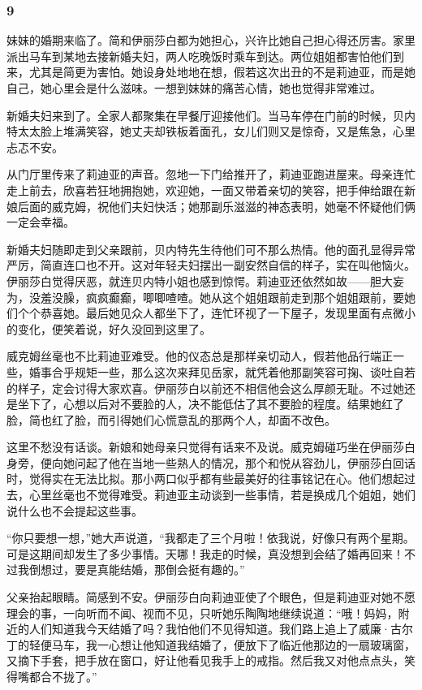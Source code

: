 \subsubsection*{9}


\par 妹妹的婚期来临了。简和伊丽莎白都为她担心，兴许比她自己担心得还厉害。家里派出马车到某地去接新婚夫妇，两人吃晚饭时乘车到达。两位姐姐都害怕他们到来，尤其是简更为害怕。她设身处地地在想，假若这次出丑的不是莉迪亚，而是她自己，她心里会是什么滋味。一想到妹妹的痛苦心情，她也觉得非常难过。
\par 新婚夫妇来到了。全家人都聚集在早餐厅迎接他们。当马车停在门前的时候，贝内特太太脸上堆满笑容，她丈夫却铁板着面孔，女儿们则又是惊奇，又是焦急，心里忐忑不安。
\par 从门厅里传来了莉迪亚的声音。忽地一下门给推开了，莉迪亚跑进屋来。母亲连忙走上前去，欣喜若狂地拥抱她，欢迎她，一面又带着亲切的笑容，把手伸给跟在新娘后面的威克姆，祝他们夫妇快活；她那副乐滋滋的神态表明，她毫不怀疑他们俩一定会幸福。
\par 新婚夫妇随即走到父亲跟前，贝内特先生待他们可不那么热情。他的面孔显得异常严厉，简直连口也不开。这对年轻夫妇摆出一副安然自信的样子，实在叫他恼火。伊丽莎白觉得厌恶，就连贝内特小姐也感到惊愕。莉迪亚还依然如故——胆大妄为，没羞没臊，疯疯癫癫，唧唧喳喳。她从这个姐姐跟前走到那个姐姐跟前，要她们个个恭喜她。最后她见众人都坐下了，连忙环视了一下屋子，发现里面有点微小的变化，便笑着说，好久没回到这里了。
\par 威克姆丝毫也不比莉迪亚难受。他的仪态总是那样亲切动人，假若他品行端正一些，婚事合乎规矩一些，那么这次来拜见岳家，就凭着他那副笑容可掬、谈吐自若的样子，定会讨得大家欢喜。伊丽莎白以前还不相信他会这么厚颜无耻。不过她还是坐下了，心想以后对不要脸的人，决不能低估了其不要脸的程度。结果她红了脸，简也红了脸，而引得她们心慌意乱的那两个人，却面不改色。
\par 这里不愁没有话谈。新娘和她母亲只觉得有话来不及说。威克姆碰巧坐在伊丽莎白身旁，便向她问起了他在当地一些熟人的情况，那个和悦从容劲儿，伊丽莎白回话时，觉得实在无法比拟。那小两口似乎都有些最美好的往事铭记在心。他们想起过去，心里丝毫也不觉得难受。莉迪亚主动谈到一些事情，若是换成几个姐姐，她们说什么也不会提起这些事。
\par “你只要想一想，”她大声说道，“我都走了三个月啦！依我说，好像只有两个星期。可是这期间却发生了多少事情。天哪！我走的时候，真没想到会结了婚再回来！不过我倒想过，要是真能结婚，那倒会挺有趣的。”
\par 父亲抬起眼睛。简感到不安。伊丽莎白向莉迪亚使了个眼色，但是莉迪亚对她不愿理会的事，一向听而不闻、视而不见，只听她乐陶陶地继续说道：“哦！妈妈，附近的人们知道我今天结婚了吗？我怕他们不见得知道。我们路上追上了威廉·古尔丁的轻便马车，我一心想让他知道我结婚了，便放下了临近他那边的一扇玻璃窗，又摘下手套，把手放在窗口，好让他看见我手上的戒指。然后我又对他点点头，笑得嘴都合不拢了。”

